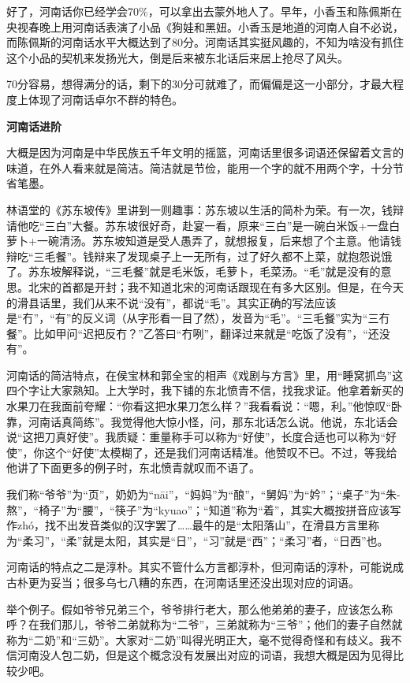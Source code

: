 \documentclass[twoside,openright,headings=optiontohead]{ctexbook} %
\begin{document}
{好了，河南话你已经学会70\%，可以拿出去蒙外地人了。早年，小香玉和陈佩斯在央视春晚上用河南话表演了小品《狗娃和黑妞。小香玉是地道的河南人自不必说，而陈佩斯的河南话水平大概达到了80分。河南话其实挺风趣的，不知为啥没有抓住这个小品的契机来发扬光大，倒是后来被东北话后来居上抢尽了风头。

70分容易，想得满分的话，剩下的30分可就难了，而偏偏是这一小部分，才最大程度上体现了河南话卓尔不群的特色。

\textbf{河南话进阶}

大概是因为河南是中华民族五千年文明的摇篮，河南话里很多词语还保留着文言的味道，在外人看来就是简洁。简洁就是节俭，能用一个字的就不用两个字，十分节省笔墨。

林语堂的《苏东坡传》里讲到一则趣事：苏东坡以生活的简朴为荣。有一次，钱辩请他吃``三白''大餐。苏东坡很好奇，赴宴一看，原来``三白''是一碗白米饭+一盘白萝卜+一碗清汤。苏东坡知道是受人愚弄了，就想报复，后来想了个主意。他请钱辩吃``三毛餐''。钱辩来了发现桌子上一无所有，过了好久都不上菜，就抱怨说饿了。苏东坡解释说，``三毛餐''就是毛米饭，毛萝卜，毛菜汤。``毛''就是没有的意思。北宋的首都是开封；我不知道北宋的河南话跟现在有多大区别。但是，在今天的滑县话里，我们从来不说``没有''，都说``毛''。其实正确的写法应该是``冇''，``有''的反义词（从字形看一目了然），发音为``毛''。``三毛餐''实为``三冇餐''。比如甲问``迟把反冇？''乙答曰``冇咧''，翻译过来就是``吃饭了没有''，``还没有''。

河南话的简洁特点，在侯宝林和郭全宝的相声《戏剧与方言》里，用``睡窝抓鸟''这四个字让大家熟知。上大学时，我下铺的东北愤青不信，找我求证。他拿着新买的水果刀在我面前夸耀：``你看这把水果刀怎么样？''我看看说：``嗯，利。''他惊叹``卧靠，河南话真简练''。我觉得他大惊小怪，问，那东北话怎么说。他说，东北话会说``这把刀真好使''。我质疑：重量称手可以称为``好使''，长度合适也可以称为``好使''，你这个``好使''太模糊了，还是我们河南话精准。他赞叹不已。不过，等我给他讲了下面更多的例子时，东北愤青就叹而不语了。

我们称``爷爷''为``页''，奶奶为``nāi''，``妈妈''为``酿''，``舅妈''为``妗''；``桌子''为``朱-熬''，``椅子''为``腰''，``筷子''为``kyuao''；``知道''称为``着''，其实大概按拼音应该写作zhó，找不出发音类似的汉字罢了\ldots{}\ldots{}最牛的是``太阳落山''，在滑县方言里称为``柔习''，``柔''就是太阳，其实是``日''，``习''就是``西''；``柔习''者，``日西''也。

河南话的特点之二是淳朴。其实不管什么方言都淳朴，但河南话的淳朴，可能说成古朴更为妥当；很多乌七八糟的东西，在河南话里还没出现对应的词语。

举个例子。假如爷爷兄弟三个，爷爷排行老大，那么他弟弟的妻子，应该怎么称呼？在我们那儿，爷爷二弟就称为``二爷''，三弟就称为``三爷''；他们的妻子自然就称为``二奶''和``三奶''。大家对``二奶''叫得光明正大，毫不觉得奇怪和有歧义。我不信河南没人包二奶，但是这个概念没有发展出对应的词语，我想大概是因为见得比较少吧。

}
\end{document}
